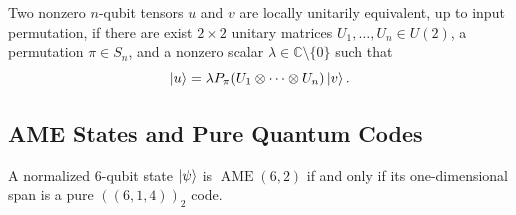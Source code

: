 \begin{definition}
    Two nonzero $n$-qubit tensors $u$ and $v$ are locally unitarily equivalent, up to input permutation, if there are exist $2\times 2$ unitary matrices $U_1,\dots,U_n\in U(2)$, a permutation $\pi\in S_n$, and a nonzero scalar $\lambda\in \mathbb{C}\setminus \{0\}$ such that 
    \begin{equation}
        \ket{u}=\lambda P_{\pi}(U_1\otimes \dots \otimes U_n)\ket{v}.
    \end{equation}
\end{definition}

\subsection{AME States and Pure Quantum Codes}

\begin{lemma}\label{lem:614 code}
    A normalized $6$-qubit state $\ket{\psi}$ is $\operatorname{AME}(6,2)$ if and only if its one-dimensional span is a pure $((6,1,4))_2$ code.
\end{lemma}

